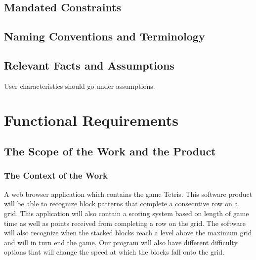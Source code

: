 \documentclass[12pt, titlepage]{article}
\begin{document}
\subsection{Mandated Constraints}

\subsection{Naming Conventions and Terminology}

\subsection{Relevant Facts and Assumptions}

User characteristics should go under assumptions.

\section{Functional Requirements}

\subsection{The Scope of the Work and the Product}

\subsubsection{The Context of the Work}

A web browser application which contains the game Tetris. This software product will be able to recognize block patterns that complete a consecutive row on a grid. This application will also contain a scoring system based on length of game time as well as points received from completing a row on the grid. The software will also recognize when the stacked blocks reach a level above the maximum grid and will in turn end the game. Our program will also have different difficulty options that will change the speed at which the blocks fall onto the grid. 
\end{document}
